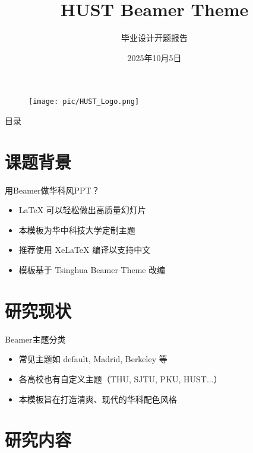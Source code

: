 \documentclass{beamer}
\title{HUST Beamer Theme}
\subtitle{毕业设计开题报告}
\institute{华中科技大学人工智能与自动化学院}
\date{2025年10月5日}
\begin{document}
\kaishu

\begin{frame}
    \titlepage
    \vspace{1em}
    \begin{figure}[htpb]
        \centering
        \texttt{[image: pic/HUST\_Logo.png]} %
    \end{figure}
\end{frame}

\begin{frame}{目录}
    \tableofcontents
\end{frame}


\section{课题背景}

\begin{frame}{用Beamer做华科风PPT？}
    \begin{itemize}[<+-| alert@+>]
        \item \LaTeX{} 可以轻松做出高质量幻灯片
        \item 本模板为华中科技大学定制主题
        \item 推荐使用 Xe\LaTeX{} 编译以支持中文
        \item 模板基于 Tsinghua Beamer Theme 改编
    \end{itemize}
\end{frame}

\section{研究现状}

\begin{frame}{Beamer主题分类}
    \begin{itemize}
        \item 常见主题如 default, Madrid, Berkeley 等
        \item 各高校也有自定义主题（THU, SJTU, PKU, HUST...）
        \item 本模板旨在打造清爽、现代的华科配色风格
    \end{itemize}
\end{frame}

\section{研究内容}
\end{document}

